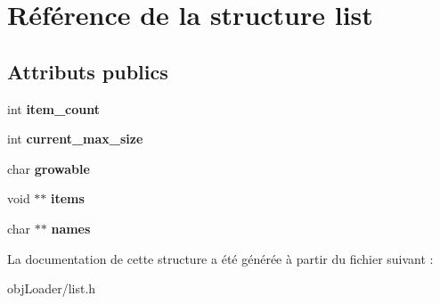 \hypertarget{structlist}{\section{Référence de la structure list}
\label{structlist}
}
\subsection*{Attributs publics}
\begin{DoxyCompactItemize}
\item 
\hypertarget{structlist_a1e4f9682bfdc33db2d825fd41658a88d}{int {\bfseries item\-\_\-count}}\label{structlist_a1e4f9682bfdc33db2d825fd41658a88d}

\item 
\hypertarget{structlist_af13cdd9f7d31327fc22ed5da5623aa27}{int {\bfseries current\-\_\-max\-\_\-size}}\label{structlist_af13cdd9f7d31327fc22ed5da5623aa27}

\item 
\hypertarget{structlist_a7da9bddee81290f233d7ec41f26824f3}{char {\bfseries growable}}\label{structlist_a7da9bddee81290f233d7ec41f26824f3}

\item 
\hypertarget{structlist_ade0b0790a7fd4f3b65aae379d5a7da85}{void $\ast$$\ast$ {\bfseries items}}\label{structlist_ade0b0790a7fd4f3b65aae379d5a7da85}

\item 
\hypertarget{structlist_a1b3f452b7de983fc5b841f4569285e57}{char $\ast$$\ast$ {\bfseries names}}\label{structlist_a1b3f452b7de983fc5b841f4569285e57}

\end{DoxyCompactItemize}


La documentation de cette structure a été générée à partir du fichier suivant \-:\begin{DoxyCompactItemize}
\item 
obj\-Loader/list.\-h\end{DoxyCompactItemize}
